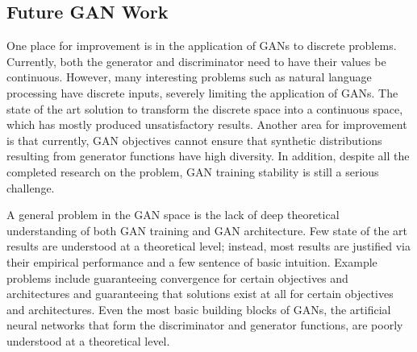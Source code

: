 \documentclass{article}
\begin{document}
\subsection{Future GAN Work}
One place for improvement is in the application of GANs to discrete problems. Currently, both the generator and discriminator need to have their values be continuous. However, many interesting problems such as natural language processing have discrete inputs, severely limiting the application of GANs. The state of the art solution to transform the discrete space into a continuous space, which has mostly produced unsatisfactory results. Another area for improvement is that currently, GAN objectives cannot ensure that synthetic distributions resulting from generator functions have high diversity. In addition, despite all the completed research on the problem, GAN training stability is still a serious challenge. 

A general problem in the GAN space is the lack of deep theoretical understanding of both GAN training and GAN architecture. Few state of the art results are understood at a theoretical level; instead, most results are justified via their empirical performance and a few sentence of basic intuition. Example problems include guaranteeing convergence for certain objectives and architectures and guaranteeing that solutions exist at all for certain objectives and architectures. Even the most basic building blocks of GANs, the artificial neural networks that form the discriminator and generator functions, are poorly understood at a theoretical level. 


\end{document}
